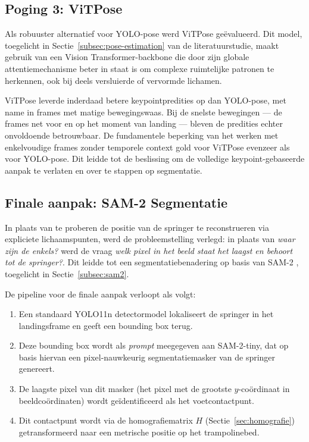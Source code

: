 \subsection{Poging 3: ViTPose}
\label{subsec:landingspositie-vitpose}

Als robuuster alternatief voor YOLO-pose werd ViTPose \autocite{Xu2022} ge{\"e}valueerd. Dit model, toegelicht in Sectie~\ref{subsec:pose-estimation} van de literatuurstudie, maakt gebruik van een Vision Transformer-backbone die door zijn globale attentiemechanisme beter in staat is om complexe ruimtelijke patronen te herkennen, ook bij deels versluierde of vervormde lichamen.

ViTPose leverde inderdaad betere keypointpredities op dan YOLO-pose, met name in frames met matige bewegingswaas. Bij de snelste bewegingen --- de frames net voor en op het moment van landing --- bleven de predities echter onvoldoende betrouwbaar. De fundamentele beperking van het werken met enkelvoudige frames zonder temporele context gold voor ViTPose evenzeer als voor YOLO-pose. Dit leidde tot de beslissing om de volledige keypoint-gebaseerde aanpak te verlaten en over te stappen op segmentatie.

\subsection{Finale aanpak: SAM-2 Segmentatie}
\label{subsec:landingspositie-sam2}

In plaats van te proberen de positie van de springer te reconstrueren via expliciete lichaamspunten, werd de probleemstelling verlegd: in plaats van \textit{waar zijn de enkels?} werd de vraag \textit{welk pixel in het beeld staat het laagst en behoort tot de springer?}. Dit leidde tot een segmentatiebenadering op basis van SAM-2 \autocite{Ravi2024}, toegelicht in Sectie~\ref{subsec:sam2}.

De pipeline voor de finale aanpak verloopt als volgt:
\begin{enumerate}
    \item Een standaard YOLO11n detectormodel lokaliseert de springer in het landingsframe en geeft een bounding box terug.
    \item Deze bounding box wordt als \textit{prompt} meegegeven aan SAM-2-tiny, dat op basis hiervan een pixel-nauwkeurig segmentatiemasker van de springer genereert.
    \item De laagste pixel van dit masker (het pixel met de grootste $y$-co{\"o}rdinaat in beeldco{\"o}rdinaten) wordt ge{\"i}dentificeerd als het voetcontactpunt.
    \item Dit contactpunt wordt via de homografiematrix $H$ (Sectie~\ref{sec:homografie}) getransformeerd naar een metrische positie op het trampolinebed.
\end{enumerate}

